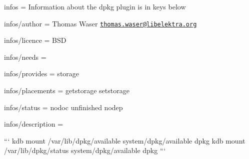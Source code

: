 
\begin{DoxyItemize}
\item infos = Information about the dpkg plugin is in keys below
\item infos/author = Thomas Waser \href{mailto:thomas.waser@libelektra.org}{\tt thomas.\+waser@libelektra.\+org}
\item infos/licence = B\+S\+D
\item infos/needs =
\item infos/provides = storage
\item infos/placements = getstorage setstorage
\item infos/status = nodoc unfinished nodep
\item infos/description =
\end{DoxyItemize}

``` kdb mount /var/lib/dpkg/available system/dpkg/available dpkg kdb mount /var/lib/dpkg/status system/dpkg/available dpkg ``` 